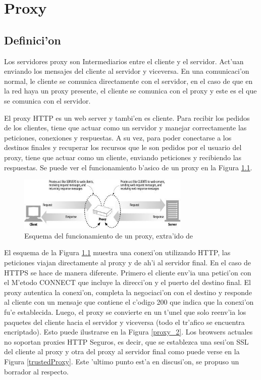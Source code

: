 \chapter{Proxy}
\label{proxy}
\section{Definici'on}

Los servidores proxy son Intermediarios entre el cliente y el servidor. Act'uan enviando los mensajes del cliente al servidor y viceversa. En una comunicaci'on normal, le cliente se comunica directamente con el servidor, en el caso de que en la red haya un proxy presente, el cliente se comunica con el proxy y este es el que se comunica con el servidor.

El proxy HTTP es un web server y tambi'en es cliente. Para recibir los pedidos de los clientes, tiene que actuar como un servidor y manejar correctamente las peticiones, conexiones y respuestas. A su vez, para poder conectarse a los destinos finales y recuperar los recursos que le son pedidos por el usuario del proxy, tiene que actuar como un cliente, enviando peticiones y recibiendo las respuestas. Se puede ver el funcionamiento b'asico de un proxy en la Figura \ref{proxy_1}.

\begin{figure}[ht!]
  	\centering
	\includegraphics[width=310px]{img/proxy_1}
	\caption{\small Esquema del funcionamiento de un proxy, extra'ido de \cite{httpGuide}}
	\label{proxy_1}
\end{figure}

El esquema de la Figura \ref{proxy_1} muestra una conexi'on utilizando HTTP, las peticiones viajan directamente al proxy y de ah'i al servidor final. En el caso de HTTPS se hace de manera diferente. Primero el cliente env'ia una petici'on con el M'etodo CONNECT que incluye la direcci'on y el puerto del destino final. El proxy autentica la conexi'on, completa la negociaci'on con el destino y responde al cliente con un mensaje que contiene el c'odigo 200 que indica que la conexi'on fu'e establecida. Luego, el proxy se convierte en un t'unel que solo reenv'ia los paquetes del cliente hacia el servidor y viceversa (todo el tr'afico se encuentra encriptado). Esto puede ilustrarse en la Figura \ref{proxy_2}.
\label{mitm}
Los browsers actuales no soportan proxies HTTP Seguros, es decir, que se establezca una sesi'on SSL del cliente al proxy y otra del proxy al servidor final como puede verse en la Figura \ref{trustedProxy}. Este 'ultimo punto est'a en discusi'on, se propuso un borrador \citep{draftTrustedProxy} al respecto.

